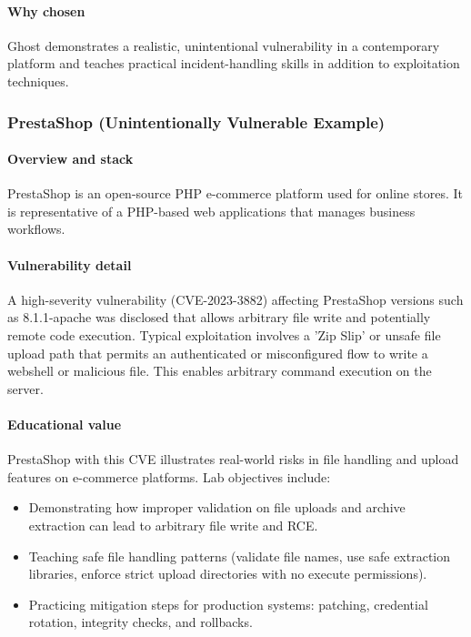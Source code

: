 \documentclass[12pt]{article}
\begin{document}
\paragraph{Why chosen}
Ghost demonstrates a realistic, unintentional vulnerability in a contemporary platform and teaches practical incident-handling skills in addition to exploitation techniques.

\subsubsection{PrestaShop (Unintentionally Vulnerable Example)}

\paragraph{Overview and stack}
PrestaShop is an open-source PHP e-commerce platform used for online stores. It is representative of a PHP-based web applications that manages business workflows.

\paragraph{Vulnerability detail}
A high-severity vulnerability (CVE-2023-3882) affecting PrestaShop versions such as 8.1.1-apache was disclosed that allows arbitrary file write and potentially remote code execution. Typical exploitation involves a 'Zip Slip' or unsafe file upload path that permits an authenticated or misconfigured flow to write a webshell or malicious file. This enables arbitrary command execution on the server.

\paragraph{Educational value}
PrestaShop with this CVE illustrates real-world risks in file handling and upload features on e-commerce platforms. Lab objectives include:
\begin{itemize}
    \item Demonstrating how improper validation on file uploads and archive extraction can lead to arbitrary file write and RCE.
    \item Teaching safe file handling patterns (validate file names, use safe extraction libraries, enforce strict upload directories with no execute permissions).
    \item Practicing mitigation steps for production systems: patching, credential rotation, integrity checks, and rollbacks.
\end{itemize}
\end{document}
